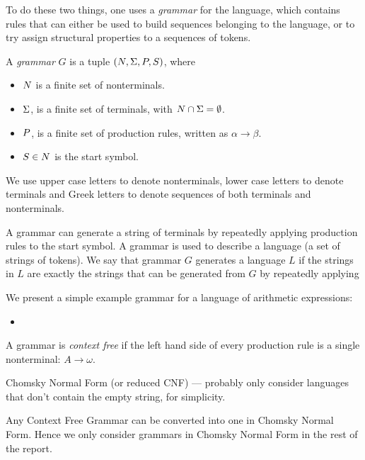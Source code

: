 To do these two things, one uses a \emph{grammar} for the language, which contains rules that can either be used to build sequences belonging to the language, or to try assign structural properties to a sequences of tokens.
\begin{Definition}
  A \emph{grammar} $G$ is a tuple $(N, \Sigma, P, S)$, where 
  \begin{itemize}
  \item $N$ is a finite set of nonterminals.
  \item $\Sigma$, is a finite set of terminals, with $N \cap \Sigma = \emptyset$.
  \item $P$, is a finite set of production rules, written as $\alpha \to \beta$.
  \item $S \in N$ is the start symbol.
  \end{itemize}
  We use upper case letters to denote nonterminals, lower case letters to denote terminals and Greek letters to denote sequences of both terminals and nonterminals.
\end{Definition}
A grammar can generate a string of terminals by repeatedly applying production rules to the start symbol.
A grammar is used to describe a language (a set of strings of tokens). We say that  grammar $G$ generates a language $L$ if the strings in $L$ are exactly the strings that can be generated from $G$ by repeatedly applying 
\begin{Example}
  We present a simple example grammar for a language of arithmetic expressions:
  \begin{itemize}
  \item 
  \end{itemize}
\end{Example}
\begin{Definition}
  A grammar is \emph{context free} if the left hand side of every production rule is a single nonterminal: $A \to \omega$.
\end{Definition}
\begin{Definition}
  Chomsky Normal Form (or reduced CNF) --- probably only consider languages that don't contain the empty string, for simplicity.
\end{Definition}
Any Context Free Grammar can be converted into one in Chomsky Normal Form. Hence we only consider grammars in Chomsky Normal Form in the rest of the report.

